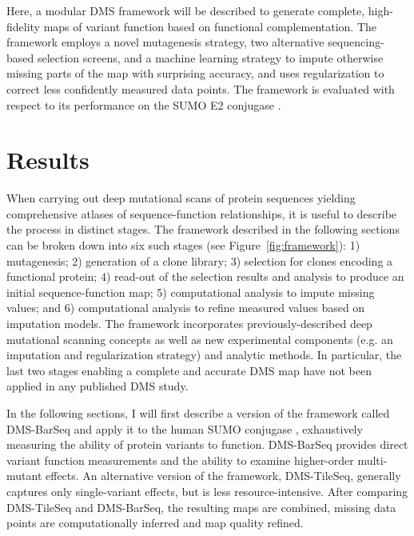 Here, a modular DMS framework will be described to generate complete, high-fidelity maps of variant function based on functional complementation. The framework employs a novel mutagenesis strategy, two alternative sequencing-based selection screens, and a machine learning strategy to impute  otherwise missing parts of the map with surprising accuracy, and uses regularization to correct less confidently measured data points. The framework is evaluated with respect to its performance on the SUMO E2 conjugase .


\section{Results}

When carrying out deep mutational scans of protein sequences yielding comprehensive atlases of sequence-function relationships, it is useful to describe the process in distinct stages. The framework described in the following sections can be broken down into six such stages (see Figure~\ref{fig:framework}): 1) mutagenesis; 2) generation of a clone library; 3) selection for clones encoding a functional protein; 4) read-out of the selection results and analysis to produce an initial sequence-function map; 5) computational analysis to impute missing values; and 6) computational analysis to refine measured values based on imputation models. The framework incorporates previously-described deep mutational scanning concepts as well as new experimental components (e.g. an imputation and regularization strategy) and analytic methods. In particular, the last two stages enabling a complete and accurate DMS map have not been applied in any published DMS study.

In the following sections, I will first describe a version of the framework called DMS-BarSeq and apply it to the human SUMO conjugase , exhaustively measuring the ability of protein variants to function. DMS-BarSeq provides direct variant function measurements and the ability to examine higher-order multi-mutant effects. An alternative version of the framework, DMS-TileSeq, generally captures only single-variant effects, but is less resource-intensive. After comparing DMS-TileSeq and DMS-BarSeq, the resulting maps are combined, missing data points are computationally inferred and map quality refined.


